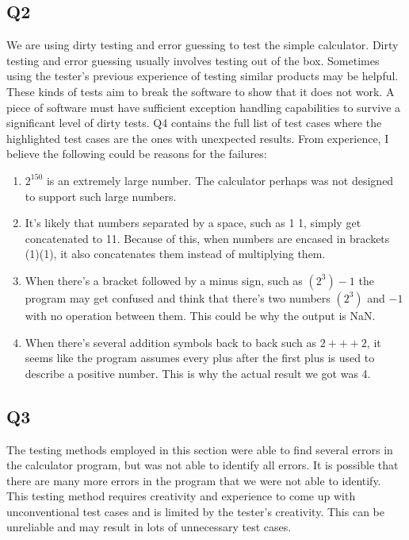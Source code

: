 \documentclass[12pt, letterpaper, titlepage]{article}
\begin{document}
\subsection*{Q2}
We are using dirty testing and error guessing to test the simple calculator. Dirty testing and error guessing usually involves testing out of the box. Sometimes using the tester's previous experience of testing similar products may be helpful. These kinds of tests aim to break the software to show that it does not work. A piece of software must have sufficient exception handling capabilities to survive a significant level of dirty tests. Q4 contains the full list of test cases where the highlighted test cases are the ones with unexpected results. From experience, I believe the following could be reasons for the failures: 
\begin{enumerate}
    \item $2^{150}$ is an extremely large number. The calculator perhaps was not designed to support such large numbers.
    \item It's likely that numbers separated by a space, such as 1 1, simply get concatenated to 11. Because of this, when numbers are encased in brackets (1)(1), it also concatenates them instead of multiplying them.
    \item  When there's a bracket followed by a minus sign, such as $(2^3)-1$ the program may get confused and think that there's two numbers $(2^3)$ and $-1$ with no operation between them. This could be why the output is NaN.
    \item When there's several addition symbols back to back such as $2+++2$, it seems like the program assumes every plus after the first plus is used to describe a positive number. This is why the actual result we got was 4. 
\end{enumerate}

\subsection*{Q3}
The testing methods employed in this section were able to find several errors in the calculator program, but was not able to identify all errors. It is possible that there are many more errors in the program that we were not able to identify. This testing method requires creativity and experience to come up with unconventional test cases and is limited by the tester's creativity. This can be unreliable and may result in lots of unnecessary test cases. 
\end{document}
